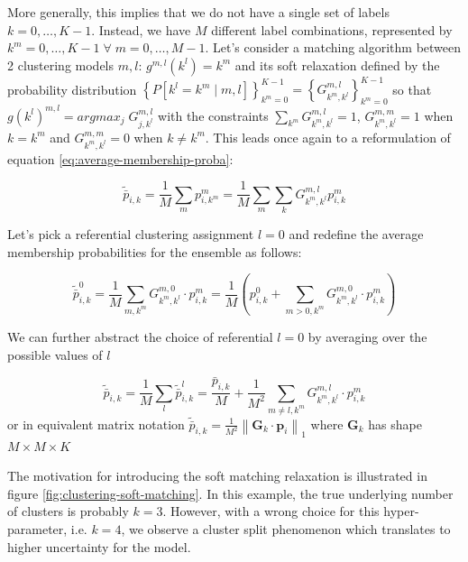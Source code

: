 More generally, this implies that we do not have a single set of labels $k=0,\ldots, K-1$. Instead, we have $M$ different label combinations, represented by $k^m=0, \ldots, K-1 \; \forall \; m = 0, \ldots, M-1$. Let's consider a matching algorithm between 2 clustering models $m,l$:
$g^{m,l}(k^l) = k^m$ and its soft relaxation defined by the probability distribution 
$
 \left\{ P \left[k^l = k^m \mid m,l \right] \right\}_{k^m=0}^{K-1} =   \left\{ G^{m,l}_{k^m, k^l} \right\}_{k^m=0}^{K-1}
$
so that $g(k^l)^{m,l} = argmax_{j} \; G^{m,l}_{j, k^l}$ with the constraints $ \sum_{k^m} G^{m,l}_{k^m, k^l} = 1$, $G^{m,m}_{k^m, k^l} = 1$ when $k = k^m$ and $ G^{m,m}_{k^m, k^l} = 0 $ when $k \not= k^m$. This leads once again to a reformulation of equation \ref{eq:average-membership-proba}:

\begin{equation} 
    \tilde{\bar{p}}_{i,k} 
    = \frac{1}{M} \sum_m p_{i,k^m}^m = 
    \frac{1}{M} \sum_m  \sum_{k}  G^{m,l}_{k^m, k^l} p_{i,k}^m
\end{equation}


Let's pick a referential clustering assignment $l=0$ and redefine the average membership probabilities for the ensemble as follows:

\begin{equation} 
    \tilde{\bar{p}}_{i,k}^0 = \frac{1}{M} \sum_{m,k^m}  G^{m,0}_{k^m, k^l}  \cdot p_{i,k}^m = \frac{1}{M} \left(p_{i,k}^0 + \sum_{m>0,k^m}  G^{m,0}_{k^m, k^l}  \cdot p_{i,k}^m \right)
\end{equation}

We can further abstract the choice of referential $l=0$ by averaging over the possible values of $l$

\begin{equation} 
    \tilde{\bar{p}}_{i,k} = \frac{1}{M} \sum_l \tilde{\bar{p}}_{i,k}^l = \frac{\bar{p}_{i,k}}{M} + \frac{1}{M^2} \sum_{m\not=l,k^m}  G^{m,l}_{k^m, k^l}  \cdot p_{i,k}^m
\end{equation}
or in equivalent matrix notation $ \tilde{\bar{p}}_{i,k} = \frac{1}{M^2} \left\lVert \boldsymbol{G}_k \cdot \boldsymbol{p}_i \right\lVert_1$ where $\boldsymbol{G}_k$ has shape $M \times M \times K$

The motivation for introducing the soft matching relaxation is illustrated in figure \ref{fig:clustering-soft-matching}. In this example, the true underlying number of clusters is probably $k=3$. However, with a wrong choice for this hyper-parameter, i.e. $k=4$, we observe a cluster split phenomenon which translates to higher uncertainty for the model.

